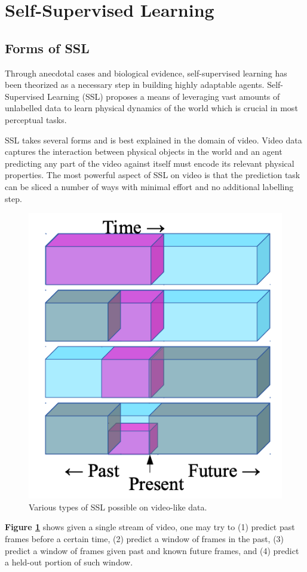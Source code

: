 \section{Self-Supervised Learning}

\subsection{Forms of SSL}

Through anecdotal cases and biological evidence, self-supervised learning has been theorized as a necessary step in building highly adaptable agents. 
Self-Supervised Learning (SSL) proposes a means of leveraging vast amounts of unlabelled data to learn physical dynamics of the world which is crucial in most perceptual tasks. 

SSL takes several forms and is best explained in the domain of video. Video data captures the interaction between physical objects in the world and an agent predicting any part of the video against itself must encode its relevant physical properties. The most powerful aspect of SSL on video is that the prediction task can be sliced a number of ways with minimal effort and no additional labelling step.

\begin{figure}
\includegraphics[width=0.5\linewidth]{figs/ssl_types.png}
\centering
\caption{Various types of SSL possible on video-like data.}
\label{fig:ssl_types}
\end{figure}

\textbf{Figure \ref{fig:ssl_types}} shows given a single stream of video, one may try to (1) predict past frames before a certain time, (2) predict a window of frames in the past, (3) predict a window of frames given past and known future frames, and (4) predict a held-out portion of such window. 

